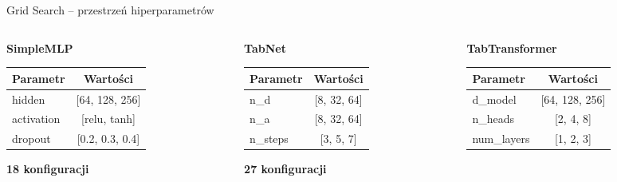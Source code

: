 \documentclass[aspectratio=169,12pt]{beamer}
\begin{document}
\begin{frame}{Grid Search -- przestrzeń hiperparametrów}
    \begin{columns}[T]
        \begin{column}{0.33\textwidth}
            \centering
            \textbf{SimpleMLP}
            \vspace{0.2cm}

            \scriptsize
            \begin{tabular}{lc}
                \toprule
                Parametr   & Wartości        \\
                \midrule
                hidden     & [64, 128, 256]  \\
                activation & [relu, tanh]    \\
                dropout    & [0.2, 0.3, 0.4] \\
                \bottomrule
            \end{tabular}

            \vspace{0.3cm}
            \textbf{18 konfiguracji}
        \end{column}
        \begin{column}{0.33\textwidth}
            \centering
            \textbf{TabNet}
            \vspace{0.2cm}

            \scriptsize
            \begin{tabular}{lc}
                \toprule
                Parametr & Wartości    \\
                \midrule
                n\_d     & [8, 32, 64] \\
                n\_a     & [8, 32, 64] \\
                n\_steps & [3, 5, 7]   \\
                \bottomrule
            \end{tabular}

            \vspace{0.3cm}
            \textbf{27 konfiguracji}
        \end{column}
        \begin{column}{0.33\textwidth}
            \centering
            \textbf{TabTransformer}
            \vspace{0.2cm}

            \scriptsize
            \begin{tabular}{lc}
                \toprule
                Parametr    & Wartości       \\
                \midrule
                d\_model    & [64, 128, 256] \\
                n\_heads    & [2, 4, 8]      \\
                num\_layers & [1, 2, 3]      \\
                \bottomrule
            \end{tabular}


\end{column}
\end{columns}
\end{frame}
\end{document}

